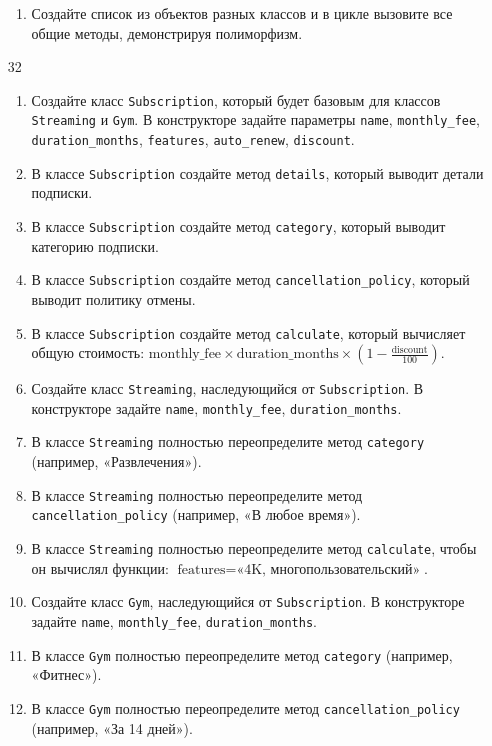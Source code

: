 \begin{enumerate}
\begin{enumerate}[leftmargin=*]
    \item Создайте список из объектов разных классов и в цикле вызовите все общие методы, демонстрируя полиморфизм.
\end{enumerate}
\item[32]
\begin{enumerate}[leftmargin=*]
    \item Создайте класс \texttt{Subscription}, который будет базовым для классов \texttt{Streaming} и \texttt{Gym}. В конструкторе задайте параметры \texttt{name}, \texttt{monthly\_fee}, \texttt{duration\_months}, \texttt{features}, \texttt{auto\_renew}, \texttt{discount}.
    \item В классе \texttt{Subscription} создайте метод \texttt{details}, который выводит детали подписки.
    \item В классе \texttt{Subscription} создайте метод \texttt{category}, который выводит категорию подписки.
    \item В классе \texttt{Subscription} создайте метод \texttt{cancellation\_policy}, который выводит политику отмены.
    \item В классе \texttt{Subscription} создайте метод \texttt{calculate}, который вычисляет общую стоимость: \( \text{monthly\_fee} \times \text{duration\_months} \times (1 - \frac{\text{discount}}{100}) \).
    \item Создайте класс \texttt{Streaming}, наследующийся от \texttt{Subscription}. В конструкторе задайте \texttt{name}, \texttt{monthly\_fee}, \texttt{duration\_months}.
    \item В классе \texttt{Streaming} полностью переопределите метод \texttt{category} (например, «Развлечения»).
    \item В классе \texttt{Streaming} полностью переопределите метод \texttt{cancellation\_policy} (например, «В любое время»).
    \item В классе \texttt{Streaming} полностью переопределите метод \texttt{calculate}, чтобы он вычислял функции: \( \text{features} = \text{«4K, многопользовательский»} \).
    \item Создайте класс \texttt{Gym}, наследующийся от \texttt{Subscription}. В конструкторе задайте \texttt{name}, \texttt{monthly\_fee}, \texttt{duration\_months}.
    \item В классе \texttt{Gym} полностью переопределите метод \texttt{category} (например, «Фитнес»).
    \item В классе \texttt{Gym} полностью переопределите метод \texttt{cancellation\_policy} (например, «За 14 дней»).

\end{enumerate}
\end{enumerate}
